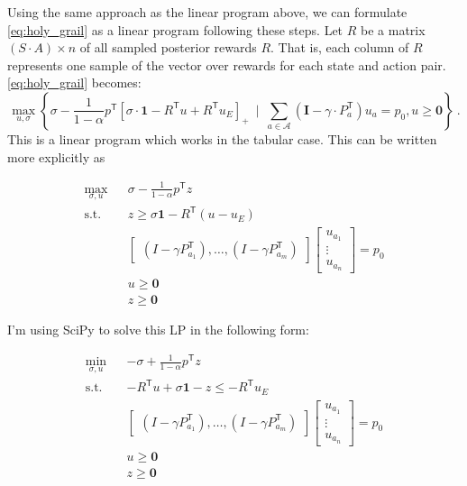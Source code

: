\documentclass{article}
\newcommand{\tr}{^\mathsf{T}}
\newcommand{\one}{\mathbf{1}}
\newcommand{\zero}{\mathbf{0}}
\newcommand{\eye}{\mathbf{I}}
\begin{document}
	Using the same approach as the linear program above, we can formulate \eqref{eq:holy_grail} as a linear program following these steps. Let $R$ be a matrix $(S\cdot A) \times n$ of all sampled posterior rewards $R$. That is, each column of $R$ represents one sample of the vector over rewards for each state and action pair. \eqref{eq:holy_grail} becomes:
	\begin{equation} \label{eq:lp_objective}
	\max_{u,\sigma} \left\{ \sigma -\frac{1}{1-\alpha} p\tr \left[\sigma\cdot\one - R\tr u  + R\tr u_E \right]_+  ~\mid~ \sum_{a\in\mathcal{A}} (\eye - \gamma\cdot P_a\tr) u_a = p_0, u \ge \zero \right\}~.  
	\end{equation}
	This is a linear program which works in the tabular case. This can be written more explicitly as 
	
\begin{eqnarray}
\max_{\sigma, u}&& \sigma - \frac{1}{1-\alpha}p\tr z \\
\text{s.t.}&& z \geq \sigma \one - R\tr(u - u_E)\\
&&\begin{bmatrix}
(I - \gamma P_{a_1}\tr), \ldots, (I - \gamma P_{a_m}\tr)
\end{bmatrix}
\begin{bmatrix}
u_{a_1} \\
\vdots\\
u_{a_n}
\end{bmatrix}
= p_0 \\
&& u \geq \zero \\
&& z \geq \zero 
\end{eqnarray}		
	
	
I'm using SciPy to solve this LP in the following form:

\begin{eqnarray}
\min_{\sigma, u}&& -\sigma + \frac{1}{1-\alpha}p\tr z \\
\text{s.t.}&& - R\tr u + \sigma \one  - z  \leq -R\tr u_E\\
&&\begin{bmatrix}
(I - \gamma P_{a_1}\tr), \ldots, (I - \gamma P_{a_m}\tr)
\end{bmatrix}
\begin{bmatrix}
u_{a_1} \\
\vdots\\
u_{a_n}
\end{bmatrix}
= p_0 \\
&& u \geq \zero \\
&& z \geq \zero 
\end{eqnarray}	
	
\end{document}
